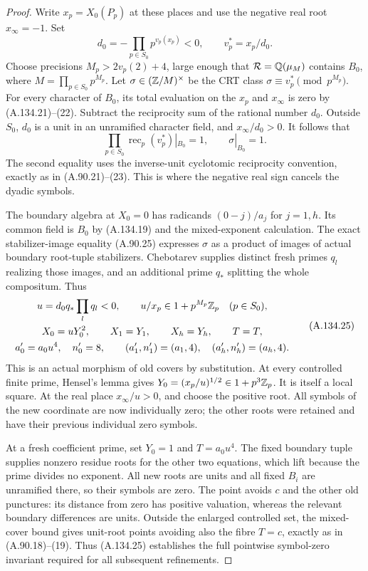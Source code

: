 \begin{proof}
Write $x_p=X_0(P_p)$ at these places and use
the negative real root $x_\infty=-1$.
Set
\[
                 d_0=-\prod_{p\in S_0}p^{v_p(x_p)}<0,
                  \qquad v_p^*=x_p/d_0.
\tag{A.134.23}
\]
Choose precisions $M_p>2v_p(2)+4$, large enough
that $\mathcal R=\mathbb Q(\mu_M)$ contains $B_0$,
where $M=\prod_{p\in S_0}p^{M_p}$.
Let $\sigma\in(\mathbb Z/M)^\times$ be the CRT class
$\sigma\equiv v_p^*\pmod{p^{M_p}}$.
For every character of $B_0$, its total
evaluation on the $x_p$ and $x_\infty$ is zero
by (A.134.21)--(22).
Subtract the reciprocity sum of the rational
number $d_0$.
Outside $S_0$, $d_0$ is a unit in an unramified
character field, and $x_\infty/d_0>0$.
It follows that
\[
                 \prod_{p\in S_0}\operatorname{rec}_p(v_p^*)|_{B_0}=1,
                         \qquad \sigma|_{B_0}=1.
\tag{A.134.24}
\]
The second equality uses the inverse-unit
cyclotomic reciprocity convention, exactly as
in (A.90.21)--(23).
This is where the negative real sign cancels
the dyadic symbols.

The boundary algebra at $X_0=0$ has radicands
$(0-j)/a_j$ for $j=1,h$.
Its common field is $B_0$ by (A.134.19) and
the mixed-exponent calculation.
The exact stabilizer-image equality (A.90.25)
expresses $\sigma$ as a product of images of
actual boundary root-tuple stabilizers.
Chebotarev supplies distinct fresh primes
$q_l$ realizing those images, and an additional
prime $q_*$ splitting the whole compositum.
Thus
\[
 \begin{gathered}
       u=d_0q_*\prod_lq_l<0,\qquad
             u/x_p\in1+p^{M_p}\mathbb Z_p\quad(p\in S_0),\\
       X_0=uY_0^2,\qquad X_1=Y_1,\qquad X_h=Y_h,\qquad
       T=T,\\
       a'_0=a_0u^4,\quad n'_0=8,\qquad
       (a'_1,n'_1)=(a_1,4),\quad
       (a'_h,n'_h)=(a_h,4).
 \end{gathered}
\tag{A.134.25}
\]
This is an actual morphism of old covers by substitution.
At every controlled finite prime, Hensel's lemma
gives $Y_0=(x_p/u)^{1/2}\in1+p^3\mathbb Z_p$.
It is itself a local square.
At the real place $x_\infty/u>0$, and choose the
positive root.
All symbols of the new coordinate are now
individually zero; the other roots were retained
and have their previous individual zero symbols.

At a fresh coefficient prime, set $Y_0=1$ and
$T=a_0u^4$.
The fixed boundary tuple supplies nonzero
residue roots for the other two equations,
which lift because the prime divides no exponent.
All new roots are units and all fixed $B_i$
are unramified there, so their symbols are zero.
The point avoids $c$ and the other old punctures:
its distance from zero has positive valuation,
whereas the relevant boundary differences are
units.
Outside the enlarged controlled set, the
mixed-cover bound gives unit-root points
avoiding also the fibre $T=c$, exactly as in
(A.90.18)--(19).
Thus (A.134.25) establishes the full
pointwise symbol-zero invariant required for
all subsequent refinements.


\end{proof}
